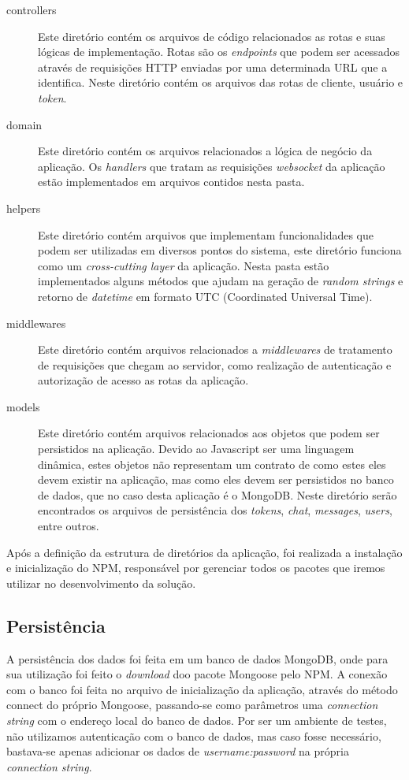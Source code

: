 \begin{description}
	\item[controllers] Este diretório contém os arquivos de código relacionados as rotas e suas lógicas de implementação. Rotas são os \textit{endpoints} que podem ser acessados através de requisições HTTP enviadas por uma determinada URL que a identifica. Neste diretório contém os arquivos das rotas de cliente, usuário e \textit{token}.
	
	\item[domain] Este diretório contém os arquivos relacionados a lógica de negócio da aplicação. Os \textit{handlers} que tratam as requisições \textit{websocket} da aplicação estão implementados em arquivos contidos nesta pasta.
	
	\item[helpers] Este diretório contém arquivos que implementam funcionalidades que podem ser utilizadas em diversos pontos do sistema, este diretório funciona como um \textit{cross-cutting layer} da aplicação. Nesta pasta estão implementados alguns métodos que ajudam na geração de \textit{random strings} e retorno de \textit{datetime} em formato UTC (Coordinated Universal Time).
	
	\item[middlewares] Este diretório contém arquivos relacionados a \textit{middlewares} de tratamento de requisições que chegam ao servidor, como realização de autenticação e autorização de acesso as rotas da aplicação.
	
	\item[models] Este diretório contém arquivos relacionados aos objetos que podem ser persistidos na aplicação. Devido ao Javascript ser uma linguagem dinâmica, estes objetos não representam um contrato de como estes eles devem existir na aplicação, mas como eles devem ser persistidos no banco de dados, que no caso desta aplicação é o MongoDB. Neste diretório serão encontrados os arquivos de persistência dos \textit{tokens}, \textit{chat}, \textit{messages}, \textit{users}, entre outros.
\end{description}

Após a definição da estrutura de diretórios da aplicação, foi realizada a instalação e inicialização do NPM, responsável por gerenciar todos os pacotes que iremos utilizar no desenvolvimento da solução.

\subsection{Persistência}
A persistência dos dados foi feita em um banco de dados MongoDB, onde para sua utilização foi feito o \textit{download} doo pacote Mongoose pelo NPM. A conexão com o banco foi feita no arquivo de inicialização da aplicação, através do método connect do próprio Mongoose, passando-se como parâmetros uma \textit{connection string} com o endereço local do banco de dados. Por ser um ambiente de testes, não utilizamos autenticação com o banco de dados, mas caso fosse necessário, bastava-se apenas adicionar os dados de \textit{username:password} na própria \textit{connection string}.

